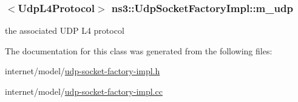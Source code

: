 \subsubsection[{\texorpdfstring{m\+\_\+udp}{m_udp}}]{$<${\bf Udp\+L4\+Protocol}$>$ ns3\+::\+Udp\+Socket\+Factory\+Impl\+::m\+\_\+udp\hspace{0.3cm}{\ttfamily [private]}}\hypertarget{classns3_1_1UdpSocketFactoryImpl_afa3aee867755fafcbe14f1426a4848a1}{}\label{classns3_1_1UdpSocketFactoryImpl_afa3aee867755fafcbe14f1426a4848a1}


the associated U\+DP L4 protocol 



The documentation for this class was generated from the following files\+:\begin{DoxyCompactItemize}
\item 
internet/model/\hyperlink{udp-socket-factory-impl_8h}{udp-\/socket-\/factory-\/impl.\+h}\item 
internet/model/\hyperlink{udp-socket-factory-impl_8cc}{udp-\/socket-\/factory-\/impl.\+cc}\end{DoxyCompactItemize}
